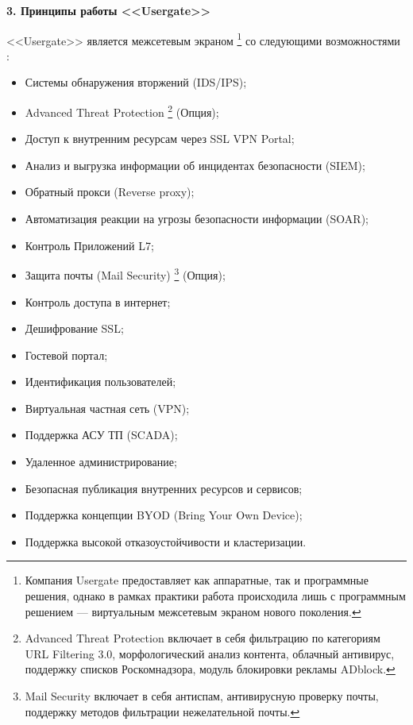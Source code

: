 \begin{center}
	\textbf{\Large 3. Принципы работы <<Usergate>>}
\end{center}

<<Usergate>> является межсетевым экраном \footnote{Компания Usergate предоставляет как аппаратные, так и программные решения, однако в рамках практики работа происходила лишь с программным решением --- виртуальным межсетевым экраном нового поколения.} со следующими возможностями \cite{usergate_capabilities}:
		
\begin{itemize}
	\item Системы обнаружения вторжений (IDS/IPS);
	\item Advanced Threat Protection \footnote{Advanced Threat Protection включает в себя фильтрацию по категориям URL Filtering 3.0, морфологический анализ контента, облачный антивирус, поддержку списков Роскомнадзора, модуль блокировки рекламы ADblock.} (Опция);
	\item Доступ к внутренним ресурсам через SSL VPN Portal;
	\item Анализ и выгрузка информации об инцидентах безопасности (SIEM);
	\item Обратный прокси (Reverse proxy);
	\item Автоматизация реакции на угрозы безопасности информации (SOAR);
	\item Контроль Приложений L7;
	\item Защита почты (Mail Security) \footnote{Mail Security включает в себя антиспам, антивирусную проверку почты, поддержку методов фильтрации нежелательной почты.} (Опция);
	\item Контроль доступа в интернет;
	\item Дешифрование SSL;
	\item Гостевой портал;
	\item Идентификация пользователей;
	\item Виртуальная частная сеть (VPN);
	\item Поддержка АСУ ТП (SCADA);
	\item Удаленное администрирование;
	\item Безопасная публикация внутренних ресурсов и сервисов;
	\item Поддержка концепции BYOD (Bring Your Own Device);
	\item Поддержка высокой отказоустойчивости и кластеризации.
\end{itemize}
	
